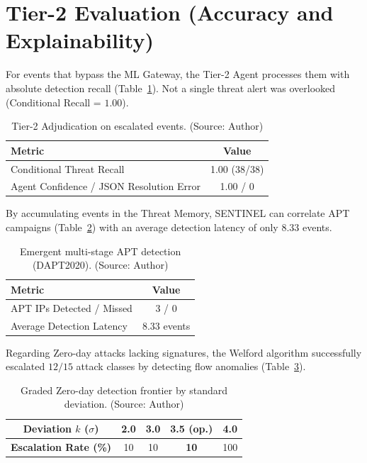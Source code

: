 \section{Tier-2 Evaluation (Accuracy and Explainability)}
For events that bypass the ML Gateway, the Tier-2 Agent processes them with absolute detection recall (Table~\ref{tab:tier2adjudication}). Not a single threat alert was overlooked (Conditional Recall = $1.00$).

\begin{table}[!htbp]
    \centering
    \caption{Tier-2 Adjudication on escalated events. (Source: Author)}
    \label{tab:tier2adjudication}
    \begin{tabular}{|l|c|}
        \hline
        \textbf{Metric} & \textbf{Value} \\ \hline
        Conditional Threat Recall & 1.00 (38/38) \\ \hline
        Agent Confidence / JSON Resolution Error & 1.00 / 0 \\ \hline
    \end{tabular}
\end{table}

By accumulating events in the Threat Memory, SENTINEL can correlate APT campaigns (Table~\ref{tab:apt}) with an average detection latency of only $8.33$ events.

\begin{table}[!htbp]
    \centering
    \caption{Emergent multi-stage APT detection (DAPT2020). (Source: Author)}
    \label{tab:apt}
    \begin{tabular}{|l|c|}
        \hline
        \textbf{Metric} & \textbf{Value} \\ \hline
        APT IPs Detected / Missed & 3 / 0 \\ \hline
        Average Detection Latency & 8.33 events \\ \hline
    \end{tabular}
\end{table}

Regarding Zero-day attacks lacking signatures, the Welford algorithm successfully escalated $12/15$ attack classes by detecting flow anomalies (Table~\ref{tab:zeroday_graded}).

\begin{table}[!htbp]
    \centering \footnotesize \setlength{\tabcolsep}{6pt}
    \caption{Graded Zero-day detection frontier by standard deviation. (Source: Author)}
    \label{tab:zeroday_graded}
    \begin{tabular}{|c|c|c|c|c|}
        \hline
        \textbf{Deviation $k$ ($\sigma$)} & 2.0 & 3.0 & \textbf{3.5 (op.)} & 4.0 \\ \hline
        \textbf{Escalation Rate (\%)} & 10 & 10 & \textbf{10} & 100 \\ \hline
    \end{tabular}
\end{table}

